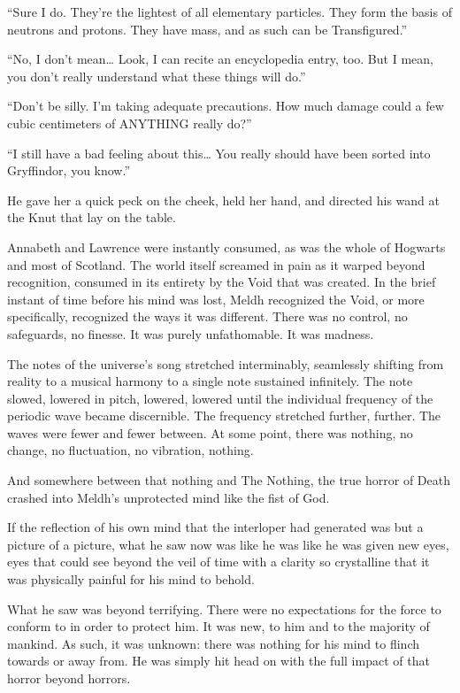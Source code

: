 “Sure I do. They’re the lightest of all elementary particles. They form the basis of neutrons and protons. They have mass, and as such can be Transfigured.”

“No, I don’t mean… Look, I can recite an encyclopedia entry, too. But I mean, you don’t really understand what these things will do.”

“Don’t be silly. I’m taking adequate precautions. How much damage could a few cubic centimeters of ANYTHING really do?”

“I still have a bad feeling about this… You really should have been sorted into Gryffindor, you know.”

He gave her a quick peck on the cheek, held her hand, and directed his wand at the Knut that lay on the table.

Annabeth and Lawrence were instantly consumed, as was the whole of Hogwarts and most of Scotland. The world itself screamed in pain as it warped beyond recognition, consumed in its entirety by the Void that was created.
\simpleline
In the brief instant of time before his mind was lost, Meldh recognized the Void, or more specifically, recognized the ways it was different. There was no control, no safeguards, no finesse. It was purely unfathomable. It was madness.

The notes of the universe’s song stretched interminably, seamlessly shifting from reality to a musical harmony to a single note sustained infinitely. The note slowed, lowered in pitch, lowered, lowered until the individual frequency of the periodic wave became discernible. The frequency stretched further, further. The waves were fewer and fewer between. At some point, there was nothing, no change, no fluctuation, no vibration, nothing.

And somewhere between that nothing and The Nothing, the true horror of Death crashed into Meldh’s unprotected mind like the fist of God.

If the reflection of his own mind that the interloper had generated was but a picture of a picture, what he saw now was like he was like he was given new eyes, eyes that could see beyond the veil of time with a clarity so crystalline that it was physically painful for his mind to behold.

What he saw was beyond terrifying. There were no expectations for the force to conform to in order to protect him. It was new, to him and to the majority of mankind. As such, it was unknown: there was nothing for his mind to flinch towards or away from. He was simply hit head on with the full impact of that horror beyond horrors.

